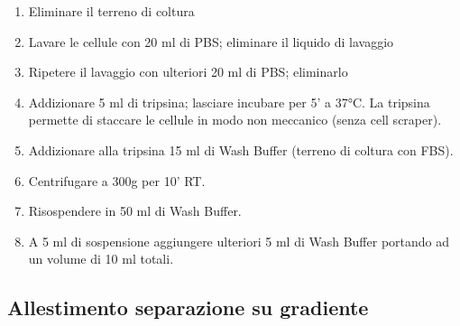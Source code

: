\begin{enumerate}

    \item Eliminare il terreno di coltura

    \item Lavare le cellule con 20 ml di PBS; eliminare il liquido di lavaggio

    \item Ripetere il lavaggio con ulteriori 20 ml di PBS; eliminarlo

    \item Addizionare 5 ml di tripsina; lasciare incubare per 5' a 37°C.
    La tripsina permette di staccare le cellule in modo non meccanico (senza cell scraper).

    \item Addizionare alla tripsina 15 ml di Wash Buffer (terreno di coltura con FBS).

    \item Centrifugare a 300g per 10' RT.

    \item Risospendere in 50 ml di Wash Buffer.

    \item A 5 ml di sospensione aggiungere ulteriori 5 ml di Wash Buffer portando
    ad un volume di 10 ml totali.

\end{enumerate}

\subsection{Allestimento separazione su gradiente}

